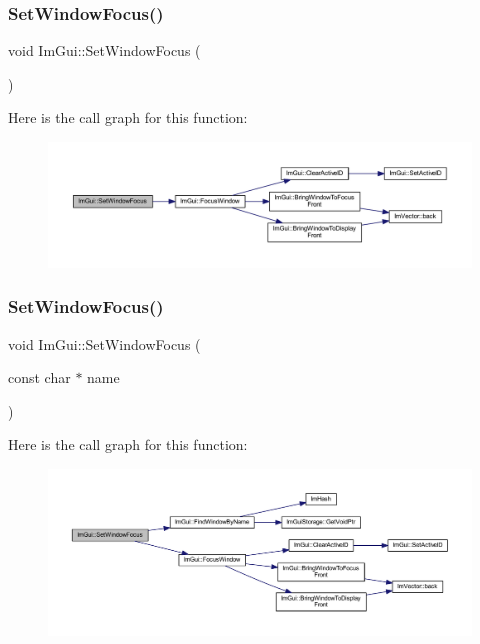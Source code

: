 \subsubsection{\texorpdfstring{Set\+Window\+Focus()}{SetWindowFocus()}\hspace{0.1cm}{\footnotesize\ttfamily [1/2]}}
{\footnotesize\ttfamily void Im\+Gui\+::\+Set\+Window\+Focus (\begin{DoxyParamCaption}{ }\end{DoxyParamCaption})}

Here is the call graph for this function\+:
\nopagebreak
\begin{figure}[H]
\begin{center}
\leavevmode
\includegraphics[width=350pt]{namespace_im_gui_ac71920931ed7b7c8594ee84c6a94e7b8_cgraph}
\end{center}
\end{figure}
\mbox{\label{namespace_im_gui_aa612adbb975051090898f094a1608f24}} 
\subsubsection{\texorpdfstring{Set\+Window\+Focus()}{SetWindowFocus()}\hspace{0.1cm}{\footnotesize\ttfamily [2/2]}}
{\footnotesize\ttfamily void Im\+Gui\+::\+Set\+Window\+Focus (\begin{DoxyParamCaption}\item[{const char $\ast$}]{name }\end{DoxyParamCaption})}

Here is the call graph for this function\+:
\nopagebreak
\begin{figure}[H]
\begin{center}
\leavevmode
\includegraphics[width=350pt]{namespace_im_gui_aa612adbb975051090898f094a1608f24_cgraph}
\end{center}
\end{figure}
\mbox{\label{namespace_im_gui_a11f2f343dbc9b00ccd9e99ebd59cfe8b}} 
